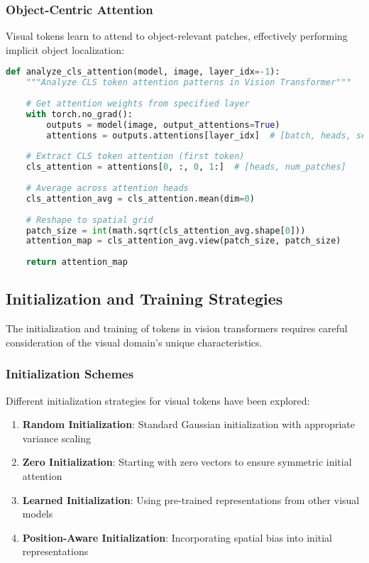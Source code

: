 \subsubsection{Object-Centric Attention}

Visual \cls{} tokens learn to attend to object-relevant patches, effectively performing implicit object localization:

\begin{lstlisting}[language=Python, caption=Analyzing CLS attention patterns in ViT]
def analyze_cls_attention(model, image, layer_idx=-1):
    """Analyze CLS token attention patterns in Vision Transformer"""
    
    # Get attention weights from specified layer
    with torch.no_grad():
        outputs = model(image, output_attentions=True)
        attentions = outputs.attentions[layer_idx]  # [batch, heads, seq_len, seq_len]
    
    # Extract CLS token attention (first token)
    cls_attention = attentions[0, :, 0, 1:]  # [heads, num_patches]
    
    # Average across attention heads
    cls_attention_avg = cls_attention.mean(dim=0)
    
    # Reshape to spatial grid
    patch_size = int(math.sqrt(cls_attention_avg.shape[0]))
    attention_map = cls_attention_avg.view(patch_size, patch_size)
    
    return attention_map
\end{lstlisting}

\subsection{Initialization and Training Strategies}

The initialization and training of \cls{} tokens in vision transformers requires careful consideration of the visual domain's unique characteristics.

\subsubsection{Initialization Schemes}

Different initialization strategies for visual \cls{} tokens have been explored:

\begin{enumerate}
\item \textbf{Random Initialization}: Standard Gaussian initialization with appropriate variance scaling
\item \textbf{Zero Initialization}: Starting with zero vectors to ensure symmetric initial attention
\item \textbf{Learned Initialization}: Using pre-trained representations from other visual models
\item \textbf{Position-Aware Initialization}: Incorporating spatial bias into initial representations
\end{enumerate}

